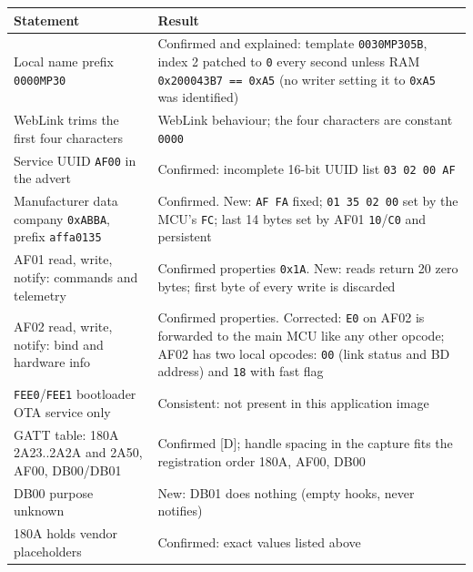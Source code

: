 {\def\LTcaptype{none} %
\begin{longtable}[]{@{}
  >{\raggedright\arraybackslash}p{}
  >{\raggedright\arraybackslash}p{}@{}}
\toprule\noalign{}
\begin{minipage}[b]{\linewidth}\raggedright
Statement
\end{minipage} & \begin{minipage}[b]{\linewidth}\raggedright
Result
\end{minipage} \\
\midrule\noalign{}
\endhead
\bottomrule\noalign{}
\endlastfoot
Local name prefix \texttt{0000MP30} & Confirmed and explained: template
\texttt{0030MP305B}, index 2 patched to
\texttt{\textquotesingle{}0\textquotesingle{}} every second unless RAM
\texttt{0x200043B7\ ==\ 0xA5} (no writer setting it to \texttt{0xA5} was
identified) \\
WebLink trims the first four characters & WebLink behaviour; the four
characters are constant \texttt{0000} \\
Service UUID \texttt{AF00} in the advert & Confirmed: incomplete 16-bit
UUID list \texttt{03\ 02\ 00\ AF} \\
Manufacturer data company \texttt{0xABBA}, prefix \texttt{affa0135} &
Confirmed. New: \texttt{AF\ FA} fixed; \texttt{01\ 35\ 02\ 00} set by
the MCU's \texttt{FC}; last 14 bytes set by AF01 \texttt{10}/\texttt{C0}
and persistent \\
AF01 read, write, notify: commands and telemetry & Confirmed properties
\texttt{0x1A}. New: reads return 20 zero bytes; first byte of every
write is discarded \\
AF02 read, write, notify: bind and hardware info & Confirmed properties.
Corrected: \texttt{E0} on AF02 is forwarded to the main MCU like any
other opcode; AF02 has two local opcodes: \texttt{00} (link status and
BD address) and \texttt{18} with fast flag \\
\texttt{FEE0}/\texttt{FEE1} bootloader OTA service only & Consistent:
not present in this application image \\
GATT table: 180A 2A23..2A2A and 2A50, AF00, DB00/DB01 & Confirmed
{[}D{]}; handle spacing in the capture fits the registration order 180A,
AF00, DB00 \\
DB00 purpose unknown & New: DB01 does nothing (empty hooks, never
notifies) \\
180A holds vendor placeholders & Confirmed: exact values listed above \\

\end{longtable}}
